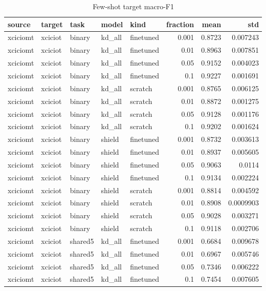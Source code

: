 \begin{table}
\caption{Few-shot target macro-F1}
\begin{tabular}{lllllrrr}
\toprule
source & target & task & model & kind & fraction & mean & std \\
\midrule
xciciomt & xciciot & binary & kd_all & finetuned & 0.001 & 0.8723 & 0.007243 \\
xciciomt & xciciot & binary & kd_all & finetuned & 0.01 & 0.8963 & 0.007851 \\
xciciomt & xciciot & binary & kd_all & finetuned & 0.05 & 0.9152 & 0.004023 \\
xciciomt & xciciot & binary & kd_all & finetuned & 0.1 & 0.9227 & 0.001691 \\
xciciomt & xciciot & binary & kd_all & scratch & 0.001 & 0.8765 & 0.006125 \\
xciciomt & xciciot & binary & kd_all & scratch & 0.01 & 0.8872 & 0.001275 \\
xciciomt & xciciot & binary & kd_all & scratch & 0.05 & 0.9128 & 0.001176 \\
xciciomt & xciciot & binary & kd_all & scratch & 0.1 & 0.9202 & 0.001624 \\
xciciomt & xciciot & binary & shield & finetuned & 0.001 & 0.8732 & 0.003613 \\
xciciomt & xciciot & binary & shield & finetuned & 0.01 & 0.8937 & 0.005605 \\
xciciomt & xciciot & binary & shield & finetuned & 0.05 & 0.9063 & 0.0114 \\
xciciomt & xciciot & binary & shield & finetuned & 0.1 & 0.9134 & 0.002224 \\
xciciomt & xciciot & binary & shield & scratch & 0.001 & 0.8814 & 0.004592 \\
xciciomt & xciciot & binary & shield & scratch & 0.01 & 0.8908 & 0.0009903 \\
xciciomt & xciciot & binary & shield & scratch & 0.05 & 0.9028 & 0.003271 \\
xciciomt & xciciot & binary & shield & scratch & 0.1 & 0.9118 & 0.002706 \\
xciciomt & xciciot & shared5 & kd_all & finetuned & 0.001 & 0.6684 & 0.009678 \\
xciciomt & xciciot & shared5 & kd_all & finetuned & 0.01 & 0.6967 & 0.005746 \\
xciciomt & xciciot & shared5 & kd_all & finetuned & 0.05 & 0.7346 & 0.006222 \\
xciciomt & xciciot & shared5 & kd_all & finetuned & 0.1 & 0.7454 & 0.007605 \\

\end{tabular}
\end{table}
